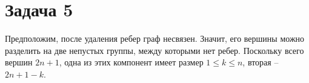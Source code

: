 











	\section*{Задача 5}

	Предположим, после удаления ребер граф несвязен. Значит, его вершины можно разделить на две непустых группы, между которыми нет ребер. Поскольку всего вершин $2n + 1$, одна из этих компонент имеет размер $1 \le k \le n$, вторая -- $2n + 1 - k$. 

